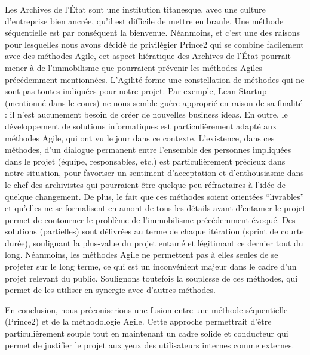 \documentclass[a4paper,12pt]{article}
\begin{document}
Les Archives de l’État sont une institution titanesque, avec une culture d’entreprise bien ancrée, qu’il est difficile de mettre en branle. Une méthode séquentielle est par conséquent la bienvenue. Néanmoins, et c’est une des raisons pour lesquelles nous avons décidé de privilégier Prince2 qui se combine facilement avec des méthodes Agile, cet aspect hiératique des Archives de l’État pourrait mener à de l’immobilisme que pourraient prévenir les méthodes Agiles précédemment mentionnées. 
L’Agilité forme une constellation de méthodes qui ne sont pas toutes indiquées pour notre projet. Par exemple, Lean Startup (mentionné dans le cours) ne nous semble guère approprié en raison de sa finalité : il n’est aucunement besoin de créer de nouvelles business ideas. En outre, le développement de solutions informatiques est particulièrement adapté aux méthodes Agile, qui ont vu le jour dans ce contexte.
L’existence, dans ces méthodes, d’un dialogue permanent entre l’ensemble des personnes impliquées dans le projet (équipe, responsables, etc.) est particulièrement précieux dans notre situation, pour favoriser un sentiment d’acceptation et d’enthousiasme dans le chef des archivistes qui pourraient être quelque peu réfractaires à l’idée de quelque changement. De plus, le fait que ces méthodes soient orientées “livrables” et qu’elles ne se formalisent en amont de tous les détails avant d’entamer le projet permet de contourner le problème de l’immobilisme précédemment évoqué. Des solutions (partielles) sont délivrées au terme de chaque itération (sprint de courte durée), soulignant la plus-value du projet entamé et  légitimant ce dernier tout du long.
Néanmoins, les méthodes Agile ne permettent pas à elles seules de se projeter sur le long terme, ce qui est un inconvénient majeur dans le cadre d’un projet relevant du public. Soulignons toutefois la souplesse de ces méthodes, qui permet de les utiliser en synergie avec d’autres méthodes.

En conclusion, nous préconiserions une fusion entre une méthode séquentielle (Prince2) et de la méthodologie Agile. Cette approche permettrait d’être particulièrement souple tout en maintenant un cadre solide et conducteur qui permet de justifier le projet aux yeux des utilisateurs internes comme externes.
\end{document}
